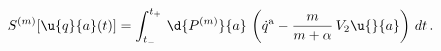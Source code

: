\begin{equation}\label{eq:action-KdV}
  S^{(m)}[\u{q}{a}(t)] = \int_{t_-}^{t_+} \,\d{P^{(m)}}{a}\,\left(
\dot{q}^{{\mathrm{a}}}- \frac{m}{m + \alpha}\,V_2\u{}{a}\right)\,dt\,.
\end{equation}

